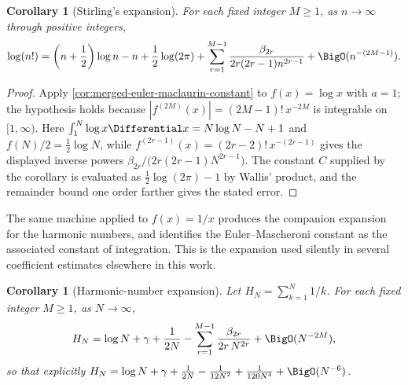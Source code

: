 \documentclass[11pt,a4paper,oneside,openany]{book}
\newtheorem{corollary}[theorem]{Corollary}
\theoremstyle{definition}
\theoremstyle{remark}
\begin{document}
\begin{corollary}[Stirling's expansion]
For each fixed integer $M\geq1$, as $n\to\infty$ through positive integers,
\begin{equation}
 \log(n!)=\left(n+\frac12\right)\log n-n+\frac12\log(2\pi)
 +\sum_{r=1}^{M-1}\frac{\beta_{2r}}{2r(2r-1)n^{2r-1}}
 +\BigO(n^{-(2M-1)}).                                                    \label{eq:merged-stirling-em}
\end{equation}
\end{corollary}

\begin{proof}
Apply \cref{cor:merged-euler-maclaurin-constant} to $f(x)=\log x$ with $a=1$;
the hypothesis holds because $|f^{(2M)}(x)|=(2M-1)!\,x^{-2M}$ is integrable on
$[1,\infty)$.  Here $\int_1^N\log x\Differential x=N\log N-N+1$ and
$f(N)/2=\frac12\log N$, while
$f^{(2r-1)}(x)=(2r-2)!\,x^{-(2r-1)}$ gives the displayed inverse powers
$\beta_{2r}/\bigl(2r(2r-1)N^{2r-1}\bigr)$.  The constant $C$ supplied by the
corollary is evaluated as $\frac12\log(2\pi)-1$ by Wallis' product, and the
remainder bound one order farther gives the stated error.
\end{proof}

The same machine applied to $f(x)=1/x$ produces the companion expansion for the
harmonic numbers, and identifies the Euler--Mascheroni constant as the
associated constant of integration.  This is the expansion used silently in
several coefficient estimates elsewhere in this work.

\begin{corollary}[Harmonic-number expansion]\label{cor:merged-harmonic-expansion}
Let $H_N=\sum_{k=1}^N1/k$.  For each fixed integer $M\ge1$, as $N\to\infty$,
\begin{equation}
 H_N=\log N+\gamma+\frac1{2N}
 -\sum_{r=1}^{M-1}\frac{\beta_{2r}}{2r\,N^{2r}}+\BigO(N^{-2M}),   \label{eq:merged-harmonic-expansion}
\end{equation}
so that explicitly
$H_N=\log N+\gamma+\frac1{2N}-\frac1{12N^2}+\frac1{120N^4}+\BigO(N^{-6})$.
\end{corollary}
\end{document}
